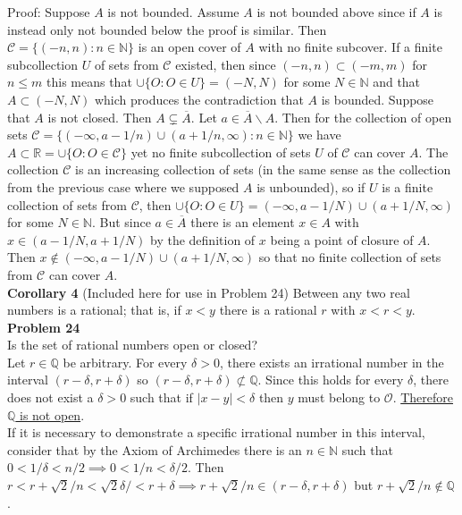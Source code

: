 \documentclass[a4paper]{article}
\begin{document}
Proof: Suppose $A$ is not bounded. Assume $A$ is not bounded above since if $A$ is instead only not bounded below the proof is similar. Then $\mathcal{C} = \{(-n,n) : n \in \mathbb{N} \}$ is an open cover of $A$ with no finite subcover. If a finite subcollection $U$ of sets from $\mathcal{C}$ existed, then since $(-n,n) \subset (-m,m)$ for $n\leq m$ this means that $\cup\{O : O \in U\} = (-N,N)$ for some $N \in \mathbb{N}$ and that $A \subset (-N,N)$ which produces the contradiction that $A$ is bounded. Suppose that $A$ is not closed. Then $A \subsetneq \overline{A}$. Let $a \in \overline{A} \backslash A$. Then for the collection of open sets $\mathcal{C} = \{(-\infty,a-1/n)\cup (a+1/n, \infty) : n \in \mathbb{N}\}$ we have $A \subset \mathbb{R} = \cup\{O : O \in \mathcal{C}\}$ yet no finite subcollection of sets $U$ of $\mathcal{C}$ can cover $A$. The collection $\mathcal{C}$ is an increasing collection of sets (in the same sense as the collection from the previous case where we supposed $A$ is unbounded), so if $U$ is a finite collection of sets from $\mathcal{C}$, then $\cup\{O : O \in U\} = (-\infty, a - 1/N) \cup (a+ 1/N, \infty)$ for some $N \in \mathbb{N}$. But since $a \in \overline{A}$ there is an element $x \in A$ with $x \in (a-1/N, a+1/N)$ by the definition of $x$ being a point of closure of $A$. Then $x \not\in (-\infty, a - 1/N) \cup (a+ 1/N, \infty)$ so that no finite collection of sets from $\mathcal{C}$ can cover $A$. \\

{\bf Corollary 4} (Included here for use in Problem 24) Between any two real numbers is a rational; that is, if $x<y$ there is a rational $r$ with $x<r<y$. \\

{\bf Problem 24}\\
Is the set of rational numbers open or closed?\\

Let $r \in \mathbb{Q}$ be arbitrary. For every $\delta >0$, there exists an irrational number in the interval $(r-\delta, r+\delta)$ so $(r-\delta, r+\delta) \not\subset \mathbb{Q}$. Since this holds for every $\delta$, there does not exist a $\delta >0$ such that if $|x-y|<\delta$ then $y$ must belong to $\mathcal{O}$. \underline{Therefore $\mathbb{Q}$ is not open}.\\

If it is necessary to demonstrate a specific irrational number in this interval, consider that by the Axiom of Archimedes there is an $n \in \mathbb{N}$ such that $0<1/\delta < n/2 \implies 0<1/n<\delta/2$. Then $r<r + \sqrt{2}/n<\sqrt{2}\delta/ < r+\delta \implies r+\sqrt{2}/n \in (r-\delta, r+\delta)$ but $r+\sqrt{2}/n \not\in \mathbb{Q}$.\\
\end{document}
